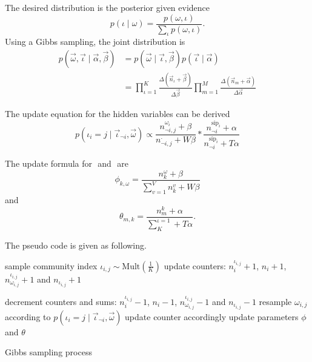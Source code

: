 \documentclass[letterpaper]{article}
\begin{document}
The desired distribution is the posterior given evidence
\begin{equation}
p( \iota \mid \omega ) = \frac{ p( \omega , \iota ) }{ \sum_{ \iota } p( \omega , \iota ) }.
\end{equation}
Using a Gibbs sampling, the joint distribution is
\begin{equation}
\begin{aligned}
p( \vec{\omega}, \vec{\iota} \mid \vec{\alpha}, \vec{\beta} )  & = p( \vec{\omega} \mid \vec{\iota}, \vec{\beta} ) p( \vec{\iota} \mid \vec{\alpha} ) \\
& = \prod_{\iota = 1}^{K} \frac{\Delta(\vec{n}_{\iota}+\vec{\beta})}{\Delta{\vec{\beta}}}
\prod_{m=1}^{M} \frac{\Delta(\vec{n}_{m}+\vec{\alpha})}{\Delta{\vec{\alpha}}}
\end{aligned}
\end{equation}

The update equation for the hidden variables can be derived
\begin{equation}
p( \iota_{i} = j \mid \vec{\iota}_{\neg i}, \vec{\omega}) \propto 
\frac{ n^{\omega_{i}}_{\neg i, j}+\beta }{ n^{\cdot}_{\neg i, j}+W\beta } \ast \frac{ n^{\mbox{sip}_{i}}_{\neg i}+\alpha }{ n^{\mbox{sip}_{i}}_{\neg i}+T\alpha }
\end{equation}

The update formula for $ $ and $ $ are
\begin{equation}
\phi_{k,\omega} = \frac{n^{\omega}_{k}+\beta}{\sum_{v=1}^{V}n^{v}_{k}+W\beta}
\end{equation}
and
\begin{equation}
\theta_{m,k} = \frac{n^{k}_{m}+\alpha}{\sum_{K}^{\iota=1}+T\alpha}.
\end{equation}

The pseudo code is given as following.
\begin{algorithm}
	\begin{algorithmic}[1]
		\State sample community index $ \iota_{i,j} \sim \mbox{Mult}(\frac{1}{K}) $
		\State update counters: $ n^{\iota_{i,j}}_{i} + 1 $, $ n_{i} + 1 $, $ n^{\iota_{i,j}}_{\omega_{i,j}} +1 $ and $ n_{\iota_{i,j}} +1 $
		\EndFor
		\EndFor
		
		\State decrement counters and sums:  $ n^{\iota_{i,j}}_{i} - 1 $, $ n_{i} - 1 $, $ n^{\iota_{i,j}}_{\omega_{i,j}} - 1 $ and $ n_{\iota_{i,j}} - 1 $ 
		\State resample $ \omega_{i,j} $ according to  $ p(\iota_{i}=j \mid \vec{\iota}_{\neg i}, \vec{\omega} ) $
		\State update counter accordingly
		\EndFor
		\EndFor
		\State update parameters $ \phi $ and $ \theta $
		\EndIf
		\EndWhile
	\end{algorithmic}
	\caption{Gibbs sampling process}
\end{algorithm}
\end{document}
